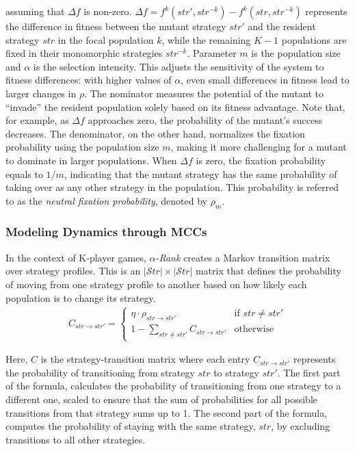         assuming that $\Delta f$ is non-zero. $\Delta f = f^k(str', str^{-k}) - f^k(str, str^{-k})$ represents the difference in fitness between the mutant strategy $str'$ and the resident strategy $str$ in the focal population $k$, while the remaining $K - 1$ populations are fixed in their monomorphic strategies $str^{-k}$. Parameter $m$ is the population size and $\alpha$ is the selection intensity. This adjusts the sensitivity of the system to fitness differences: with higher values of $\alpha$, even small differences in fitness lead to larger changes in $\rho$. The nominator measures the potential of the mutant to ``invade'' the resident population solely based on its fitness advantage. Note that, for example, as $\Delta f$ approaches zero, the probability of the mutant's success decreases. The denominator, on the other hand, normalizes the fixation probability using the population size $m$, making it more challenging for a mutant to dominate in larger populations. When $\Delta f$ is zero, the fixation probability equals to $1/m$, indicating that the mutant strategy has the same probability of taking over as any other strategy in the population. This probability is referred to as the \emph{neutral fixation probability}, denoted by $\rho_m$.

    \subsubsection{Modeling Dynamics through MCCs}
    
        In the context of K-player games, \emph{$\alpha$-Rank} creates a Markov transition matrix over strategy profiles. This is an $|\mathcal{S}tr| \times |\mathcal{S}tr|$ matrix that defines the probability of moving from one strategy profile to another based on how likely each population is to change its strategy.
        \begin{eqnarray}
            C_{str \to str'} = 
            \begin{cases} 
                \eta \cdot \rho_{str \to str'} & \text{if } str \neq str' \\ 
                1 - \sum_{str \neq str'} C_{str \to str'} & \text{otherwise}
            \end{cases} 
            \label{eq:transition_matrix_entry}
        \end{eqnarray}

        \noindent
        Here, $C$ is the strategy-transition matrix where each entry $C_{str \to str'}$ represents the probability of transitioning from strategy $str$ to strategy $str'$. The first part of the formula, calculates the probability of transitioning from one strategy to a different one, scaled to ensure that the sum of probabilities for all possible transitions from that strategy sums up to 1. The second part of the formula, computes the probability of staying with the same strategy, $str$, by excluding transitions to all other strategies.\tinydouble

